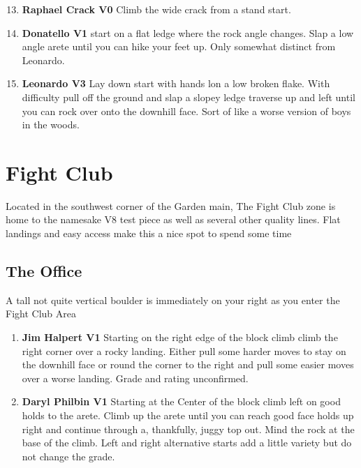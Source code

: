 \begin{enumerate}[]
	\setcounter{enumi}{12}
	\item\label{rt:Raphael Crack} \colorbox{green!20}{\textbf{Raphael Crack V0   } }
	\newline Climb the wide crack from a stand start.\
	\setcounter{enumi}{13}
	\item\label{rt:Donatello} \colorbox{green!20}{\textbf{Donatello V1   } }
	\newline start on a flat ledge where the rock angle changes. Slap a low angle arete until you can hike your feet up. Only somewhat distinct from Leonardo.\
	\setcounter{enumi}{14}
	\item\label{rt:Leonardo} \colorbox{green!20}{\textbf{Leonardo V3 \ding{72}  } }
	\newline Lay down start with hands lon a low broken flake. With difficulty pull off the ground and slap a slopey ledge traverse up and left until you can rock over onto the downhill face. Sort of like a worse version of boys in the woods.\
\end{enumerate}
\section{Fight Club}\label{sa:Fight Club}
Located in the southwest corner of the Garden main, The Fight Club zone is home to the namesake V8 test piece as well as several other quality lines. Flat landings and easy access make this a nice spot to spend some time
\subsection*{The Office}\label{bf:The Office}
A tall not quite vertical boulder is immediately on your right as you enter the Fight Club Area

\begin{enumerate}[]
	\setcounter{enumi}{0}
	\item\label{rt:Jim Halpert} \colorbox{green!20}{\textbf{Jim Halpert V1  \warn \warn } }
	\newline Starting on the right edge of the block climb climb the right corner over a rocky landing. Either pull some harder moves to stay on the downhill face or round the corner to the right and pull some easier moves over a worse landing. Grade and rating unconfirmed.\
	\setcounter{enumi}{1}
	\item\label{rt:Daryl Philbin} \colorbox{green!20}{\textbf{Daryl Philbin V1     \warn } }
	\newline Starting at the Center of the block climb left on good holds to the arete. Climb up the arete until you can reach good face holds up right and continue through a, thankfully, juggy top out. Mind the rock at the base of the climb. Left and right alternative starts add a little variety but do not change the grade.\
\end{enumerate}
